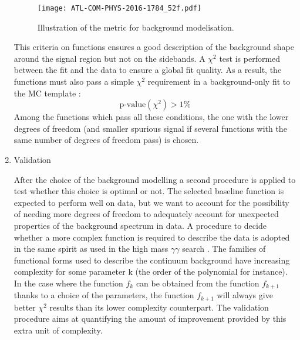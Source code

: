 \begin{enumerate}
\begin{figure}[htbp]
\centering
\texttt{[image: ATL-COM-PHYS-2016-1784\_52f.pdf]}
\caption{\label{fig:HGam_spuriousMetric}
Illustration of the metric for background modelisation. \cite{ATL-COM-PHYS-2016-1784}}
\end{figure}


This criteria on functions ensures a good description of the background shape around the signal region but not on the sidebands.
A \(\chi^{\text{2}}\) test is performed between the fit and the data to ensure a global fit quality.
As a result, the functions must also pass a simple $\chi^2$ requirement in a background-only fit to the MC template :
\begin{equation}
\text{p-value}(\chi^2)>1\%
\end{equation}
Among the functions which pass all these conditions, the one with the lower degrees of freedom (and smaller spurious signal if several functions with the same number of degrees of freedom pass) is chosen.


\item Validation
  \label{sec:orgd9c84d4}

  After the choice of the background modelling a second procedure is applied to test whether this choice is optimal or not.
  The selected baseline function is expected to perform well on data, but we want to account for the possibility of needing more degrees of freedom to adequately account for unexpected properties of the background spectrum in data.
  A procedure to decide whether a more complex function is required to describe the data is adopted in the same spirit as used in the high mass $\gamma\gamma$ search \cite{ATL-COM-PHYS-2015-1246}.
  The families of functional forms used to describe the continuum background have increasing complexity for some parameter k (the order of the polynomial for instance).
  In the case where the function $f_k$ can be obtained from the function $f_{k+1}$ thanks to a choice of the parameters, the function $f_{k+1}$ will always give better \(\chi^{\text{2}}\) results than its lower complexity counterpart.
  The validation procedure aims at quantifying the amount of improvement provided by this extra unit of complexity.


\end{enumerate}
